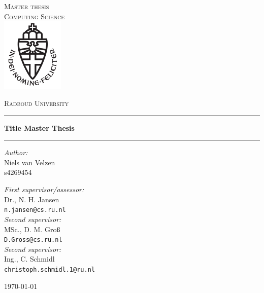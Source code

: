 \documentclass[11pt,a4paper]{report}
\begin{document}
\begin{titlepage}
\begin{center}
\textsc{\LARGE Master thesis\\Computing Science}\\[1.5cm]
\includegraphics[height=100pt]{logo}

\vspace{0.4cm}
\textsc{\Large Radboud University}\\[1cm]
\hrule
\vspace{0.4cm}
\textbf{\huge Title Master Thesis}\\[0.4cm]
\hrule
\vspace{2cm}
\begin{minipage}[t]{0.45\textwidth}
\begin{flushleft} \large
\textit{Author:}\\
Niels van Velzen\\
s4269454
\end{flushleft}
\end{minipage}
\begin{minipage}[t]{0.45\textwidth}
\begin{flushright} \large
\textit{First supervisor/assessor:}\\
Dr., N. H. Jansen\\
\texttt{n.jansen@cs.ru.nl}\\[1.3cm]
\textit{Second supervisor:}\\
MSc., D. M. Gro{\ss}\\
\texttt{D.Gross@cs.ru.nl}\\[1.3cm]
\textit{Second supervisor:}\\
Ing., C. Schmidl\\
\texttt{christoph.schmidl.1@ru.nl}\\[1.3cm]
\end{flushright}
\end{minipage}
\vfill
{\large \today}
\end{center}
\end{titlepage}



\tableofcontents










\appendix

\end{document}
